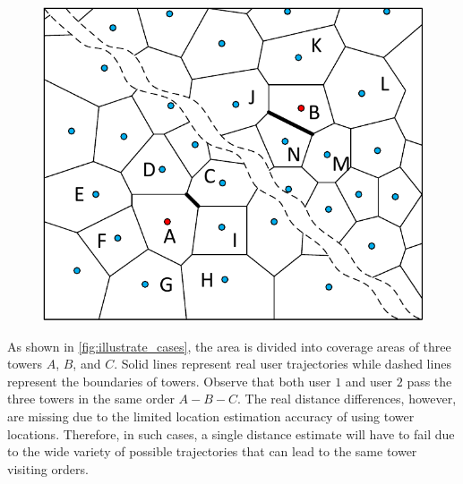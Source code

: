 \begin{figure}
\begin{minipage}{.33\textwidth}
  \label{fig:voronoi}
\end{minipage}
\begin{minipage}{.33\textwidth}
  \centering
  \vspace{0.1in}
  {\includegraphics[width=0.935\linewidth]{./figures/virtual_boundary.pdf}}
  \vspace{0.25in}
  \label{fig:virtual}
\end{minipage}
\end{figure}





As shown in \autoref{fig:illustrate_cases}, the area is divided into coverage areas of three towers $A$, $B$, and $C$. Solid lines represent real user trajectories while dashed lines represent the boundaries of towers. Observe that both user $1$ and user $2$ pass the three towers in the same order $A - B - C$. The real distance differences, however, are missing due to the limited location estimation accuracy of using tower locations. Therefore, in such cases, a single distance estimate will have to fail due to the wide variety of possible trajectories that can lead to the same tower visiting orders.

